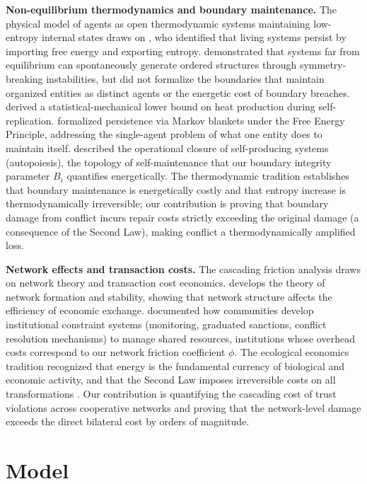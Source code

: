 \documentclass[11pt]{article}
\theoremstyle{plain}
\theoremstyle{definition}
\theoremstyle{remark}
\let\origsection\section
\renewcommand{\section}{\needspace{12\baselineskip}\origsection}
\begin{document}
\textbf{Non-equilibrium thermodynamics and boundary maintenance.} The
physical model of agents as open thermodynamic systems maintaining
low-entropy internal states draws on \citet{Schrodinger1944}, who
identified that living systems persist by importing free energy and
exporting entropy. \citet{Prigogine1978} demonstrated that systems far
from equilibrium can spontaneously generate ordered structures through
symmetry-breaking instabilities, but did not formalize the boundaries
that maintain organized entities as distinct agents or the energetic
cost of boundary breaches. \citet{England2013} derived a
statistical-mechanical lower bound on heat production during
self-replication. \citet{Friston2013} formalized persistence via Markov
blankets under the Free Energy Principle, addressing the single-agent
problem of what one entity does to maintain itself. \citet{Maturana1980}
described the operational closure of self-producing systems
(autopoiesis), the topology of self-maintenance that our boundary
integrity parameter \(B_i\) quantifies energetically. The thermodynamic
tradition establishes that boundary maintenance is energetically costly
and that entropy increase is thermodynamically irreversible; our
contribution is proving that boundary damage from conflict incurs repair
costs strictly exceeding the original damage (a consequence of the
Second Law), making conflict a thermodynamically amplified loss.

\textbf{Network effects and transaction costs.} The cascading friction
analysis draws on network theory and transaction cost economics.
\citet{Jackson2008} develops the theory of network formation and
stability, showing that network structure affects the efficiency of
economic exchange. \citet{Ostrom1990} documented how communities develop
institutional constraint systems (monitoring, graduated sanctions,
conflict resolution mechanisms) to manage shared resources, institutions
whose overhead costs correspond to our network friction coefficient
\(\phi\). The ecological economics tradition
\citep{Lotka1922, GeorgescuRoegen1971} recognized that energy is the
fundamental currency of biological and economic activity, and that the
Second Law imposes irreversible costs on all transformations
\citep{GeorgescuRoegen1979}. Our contribution is quantifying the
cascading cost of trust violations across cooperative networks and
proving that the network-level damage exceeds the direct bilateral cost
by orders of magnitude.

\section{Model}\label{model}
\end{document}

